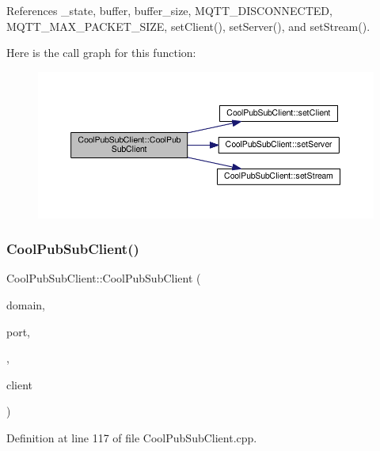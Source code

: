 References \+\_\+state, buffer, buffer\+\_\+size, M\+Q\+T\+T\+\_\+\+D\+I\+S\+C\+O\+N\+N\+E\+C\+T\+ED, M\+Q\+T\+T\+\_\+\+M\+A\+X\+\_\+\+P\+A\+C\+K\+E\+T\+\_\+\+S\+I\+ZE, set\+Client(), set\+Server(), and set\+Stream().

Here is the call graph for this function\+:\nopagebreak
\begin{figure}[H]
\begin{center}
\leavevmode
\includegraphics[width=350pt]{d8/d4b/class_cool_pub_sub_client_a103e7286407babde84d63bb735c4e4b6_cgraph}
\end{center}
\end{figure}
\mbox{\label{class_cool_pub_sub_client_a2aea0a9487dc15b9db1caf0f069eb877}} 
\subsubsection{\texorpdfstring{Cool\+Pub\+Sub\+Client()}{CoolPubSubClient()}\hspace{0.1cm}{\footnotesize\ttfamily [13/14]}}
{\footnotesize\ttfamily Cool\+Pub\+Sub\+Client\+::\+Cool\+Pub\+Sub\+Client (\begin{DoxyParamCaption}\item[{const char $\ast$}]{domain,  }\item[{uint16\+\_\+t}]{port,  }\item[{\hyperlink{class_cool_pub_sub_client_a021ec75e9fbaf658370b8005ccfddc14}{M\+Q\+T\+T\+\_\+\+C\+A\+L\+L\+B\+A\+C\+K\+\_\+\+S\+I\+G\+N\+A\+T\+U\+RE}}]{,  }\item[{Client \&}]{client }\end{DoxyParamCaption})}



Definition at line 117 of file Cool\+Pub\+Sub\+Client.\+cpp.



